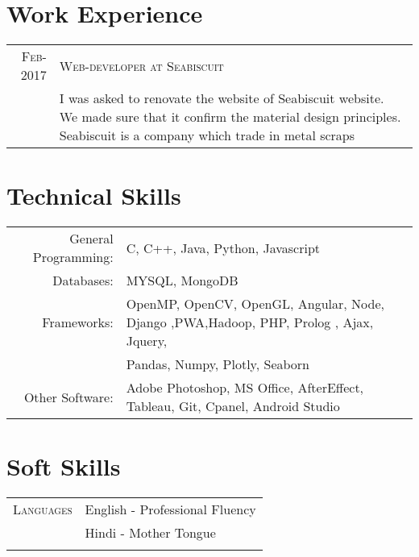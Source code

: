 \documentclass[a4paper,10pt]{article}
\begin{document}
\section{Work Experience}
\begin{tabular}{r|p{11cm}}
\textsc{Feb-2017}&\textsc{Web-developer at Seabiscuit}\\ &\footnotesize{I was asked to renovate the website of Seabiscuit website. We made sure that it confirm
the material design principles. Seabiscuit is a company which trade in metal scraps}\\
\end{tabular}

\section{Technical Skills}
\begin{tabular}{rl}
 General Programming:& C, C++, Java, Python, Javascript\\
 Databases:&MYSQL, MongoDB \\
 Frameworks:& OpenMP, OpenCV, OpenGL, Angular, Node, Django ,PWA,Hadoop, PHP, Prolog , Ajax, Jquery,\\ &Pandas, Numpy, Plotly, Seaborn\\
 Other Software: & Adobe Photoshop, MS Office, AfterEffect, Tableau, Git, Cpanel, Android Studio\\
 
\end{tabular}
\section{Soft Skills}
\begin{tabular}{rl}
\textsc{Languages} &English - Professional Fluency\\&Hindi - Mother Tongue\\ \\
\end{tabular}
\end{document}
